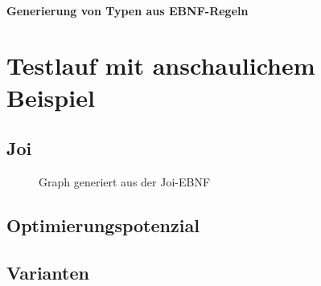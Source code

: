 \documentclass[../InterneDSLs.tex]{subfiles}
\begin{document}
\subsubsection{Generierung von Typen aus EBNF-Regeln}


\chapter{Testlauf mit anschaulichem Beispiel}\label{SEC:Example}

\section{Joi}
\begin{figure}[ht]
    
\end{figure}
\begin{figure}[ht]
\centering
\resizebox{0.5\linewidth}{!}{}
\caption{Graph generiert aus der Joi-EBNF}
\label{FIG:JoiGraph}
\end{figure}

\section{Optimierungspotenzial}


\section{Varianten}
\end{document}

